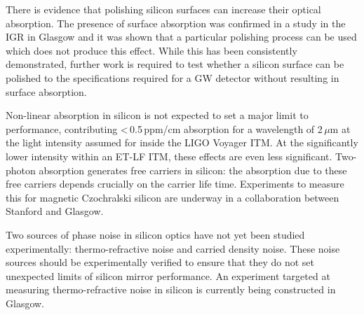 There is evidence that polishing silicon surfaces can increase their optical absorption. The presence of surface absorption was confirmed in a study in the IGR in Glasgow \cite{SiliconSurfaceAbsorpBell2017} and it was shown that a particular polishing process can be used which does not produce this effect. While this has been consistently demonstrated, further work is required to test whether a silicon surface can be polished to the specifications required for a GW detector without resulting in surface absorption.

Non-linear absorption in silicon is not expected to set a major limit to performance, contributing <\,0.5\,ppm/cm absorption for a wavelength of 2\,$\mu$m at the light intensity assumed for inside the LIGO Voyager ITM. At the significantly lower intensity within an ET-LF ITM, these effects are even less significant. Two-photon absorption generates free carriers in silicon: the absorption due to these free carriers depends crucially on the carrier life time. Experiments to measure this for magnetic Czochralski silicon are underway in a collaboration between Stanford and Glasgow.

Two sources of phase noise in silicon optics have not yet been studied experimentally: thermo-refractive noise and carried density noise. These noise sources should be experimentally verified to ensure that they do not set unexpected limits of silicon mirror performance. An experiment targeted at measuring thermo-refractive noise in silicon is currently being constructed in Glasgow.


